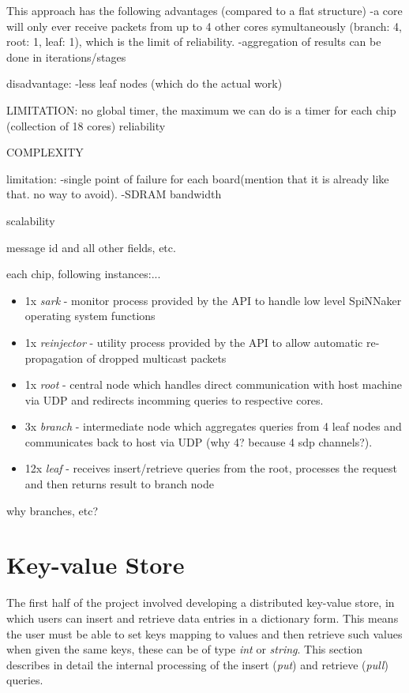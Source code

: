 This approach has the following advantages (compared to a flat structure)
-a core will only ever receive packets from up to 4 other cores symultaneously (branch: 4, root: 1, leaf: 1), which is the limit of reliability.
-aggregation of results can be done in iterations/stages

disadvantage:
-less leaf nodes (which do the actual work)

LIMITATION:
no global timer, the maximum we can do is a timer for each chip (collection of 18 cores)
reliability

COMPLEXITY

limitation:
-single point of failure for each board(mention that it is already like that. no way to avoid).
-SDRAM bandwidth

scalability

message id and all other fields, etc.

each chip, following instances:...

\begin{itemize}
\item 1x \textit{sark} - monitor process provided by the API to handle low level SpiNNaker operating system functions
\item 1x \textit{reinjector} - utility process provided by the API to allow automatic re-propagation of dropped multicast packets
\item 1x \textit{root} - central node which handles direct communication with host machine via UDP and redirects incomming queries to respective cores. 
\item 3x \textit{branch} - intermediate node which aggregates queries from 4 leaf nodes and communicates back to host via UDP (why 4? because 4 sdp channels?). 
\item 12x \textit{leaf} - receives insert/retrieve queries from the root, processes the request and then returns result to branch node
\end{itemize}
why branches, etc?


\section{Key-value Store}
The first half of the project involved developing a distributed key-value store, in which users can insert and retrieve data entries in a dictionary form. This means the user must be able to set keys mapping to values and then retrieve such values when given the same keys, these can be of type \textit{int} or \textit{string}. This section describes in detail the internal processing of the insert (\textit{put}) and retrieve (\textit{pull}) queries. 

